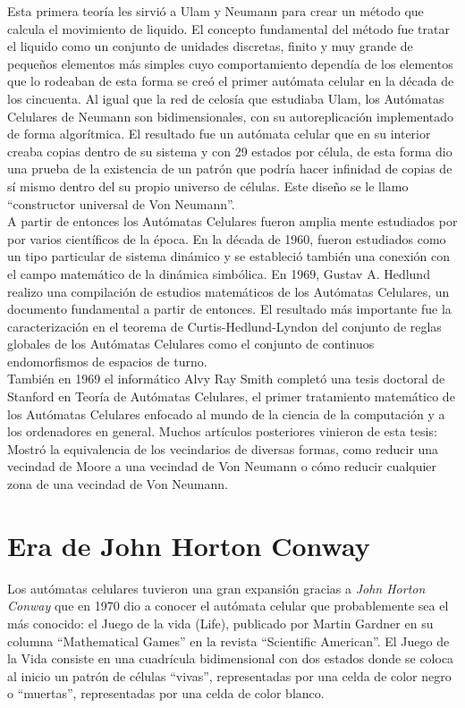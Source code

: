Esta primera teoría les sirvió a Ulam y Neumann para crear un método que calcula el movimiento de liquido. El concepto fundamental del método fue tratar el liquido como un conjunto de unidades discretas, finito y muy grande de pequeños elementos más simples cuyo comportamiento dependía de los elementos que lo rodeaban de esta forma se creó el primer autómata celular en la década de los cincuenta. Al igual que la red de celosía que estudiaba Ulam, los Autómatas Celulares de Neumann son bidimensionales, con su autoreplicación implementado de forma algorítmica. El resultado fue un autómata celular que en su interior creaba copias dentro de su sistema y con 29 estados por célula, de esta forma dio una prueba de la existencia de un patrón que podría hacer infinidad de copias de sí mismo dentro del su propio universo de células. Este diseño se le llamo ``constructor universal de Von Neumann''.\\

A partir de entonces los Autómatas Celulares fueron amplia mente estudiados por por varios científicos de la época.
En la década de 1960, fueron estudiados como un tipo particular de sistema dinámico y se estableció también una conexión con el campo matemático de la dinámica simbólica. En 1969, Gustav A. Hedlund realizo una compilación de estudios matemáticos de los Autómatas Celulares, un documento fundamental a partir de entonces. El resultado más importante fue la caracterización en el teorema de Curtis-Hedlund-Lyndon del conjunto de reglas globales de los Autómatas Celulares como el conjunto de continuos endomorfismos de espacios de turno.\\

También en 1969 el informático Alvy Ray Smith\cite{alvy} completó una tesis doctoral de Stanford en Teoría de Autómatas Celulares, el primer tratamiento matemático de los Autómatas Celulares enfocado al mundo de la ciencia de la computación y a los ordenadores en general. Muchos artículos posteriores vinieron de esta tesis: Mostró la equivalencia de los vecindarios de diversas formas, como reducir una vecindad de Moore a una vecindad de Von Neumann o cómo reducir cualquier zona de una vecindad de Von Neumann.



\section{Era de John Horton Conway} %
Los autómatas celulares tuvieron una gran expansión gracias a \textit{John Horton Conway} que en 1970 dio a conocer el autómata celular que probablemente sea el más conocido: el Juego de la vida (Life), publicado por Martin Gardner en su columna ``Mathematical Games'' en la revista ``Scientific American''. El Juego de la Vida consiste en una cuadrícula bidimensional con dos estados donde se coloca al inicio un patrón de células ``vivas'', representadas por una celda de color negro o ``muertas'', representadas por una celda de color blanco. 

